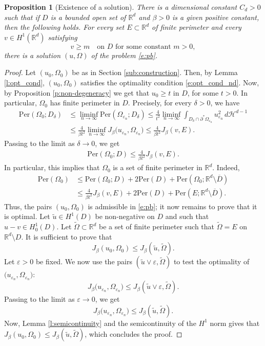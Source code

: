 \documentclass[11pt]{article}
\numberwithin{equation}{section}
\newcommand{\Per}{\mathrm{Per}}
\theoremstyle{plain}
\newtheorem{prop}[teo]{Proposition}
\theoremstyle{definition}
\let\eps\varepsilon
\def\R{\mathbb{R}}
\def\HH{\mathcal{H}}
\begin{document}
\begin{prop}[Existence of a solution]
There is a dimensional constant $C_d>0$ such that if $D$ is a bounded open set of $\R^d$ and $\beta>0$ is a given positive constant, then the following holds. For every set $E\subset\R^d$ of finite perimeter and every $v\in H^1(\R^d)$ satisfying
\[v\ge m\quad\text{on } D\text{ for some constant } m>0,\]
there is a solution $(u,\Omega)$ of the problem \eqref{e:pb}.
\end{prop}
\begin{proof}
Let $(u_0,\Omega_0)$ be as in Section \ref{sub:construction}. Then, by Lemma \ref{l:opt_cond}, $(u_0,\Omega_0)$ satisfies the optimality condition \eqref{e:opt_cond_nd}. Now, by Proposition \ref{p:non-degeneracy} we get that $u_0\ge t$ in $D$, for some $t>0$. In particular, $\Omega_0$ has finite perimeter in $D$. Precisely, for every $\delta>0$, we have
\begin{align*}
\Per(\Omega_0;D_\delta)&\le \liminf_{n\to\infty}\Per(\Omega_{\eps_n};D_\delta)\le \frac4{t^2}\liminf_{n\to\infty}\int_{D_\delta\cap\partial^\ast\Omega_{\eps_n}}u_{\eps_n}^2\,d\HH^{d-1}\\
&\le \frac4{\beta t^2}\liminf_{n\to\infty}J_\beta\big(u_{\eps_n},\Omega_{\eps_n}\big)\le \frac4{\beta t^2} J_\beta(v,E).
\end{align*}
Passing to the limit as $\delta\to0$, we get
\begin{align*}
\Per(\Omega_0;D)\le \frac4{\beta t^2} J_\beta(v,E).
\end{align*}
In particular, this implies that $\Omega_0$ is a set of finite perimeter in $\R^d$. Indeed,
\begin{align*}
\Per(\Omega_0)&\le \Per(\Omega_0;D)+2\Per(D)+\Per(\Omega_0;\R^d\setminus \overline D)\\
&\le \frac4{\beta t^2} J_\beta(v,E)+2\Per(D)+\Per(E;\R^d\setminus \overline D).
\end{align*}
Thus, the pairs $(u_0,\Omega_0)$ is admissible in \eqref{e:pb}; it now remains to prove that it is optimal. Let $\widetilde u\in H^1(D)$ be non-negative on $D$ and such that $u-v\in H^1_0(D)$. Let $\widetilde \Omega\subset\R^d$ be a set of finite perimeter such that $\widetilde \Omega=E$ on $\R^d\setminus D$. It is sufficient to prove that
\[J_\beta(u_0,\Omega_0)\le J_\beta(\widetilde u,\widetilde\Omega).\]
Let $\eps>0$ be fixed. We now use the pairs $(\widetilde u\vee \eps,\widetilde\Omega)$ to test the optimality of $\big(u_{\eps_n},\Omega_{\eps_n}\big)$:
\[J_\beta\big(u_{\eps_n},\Omega_{\eps_n}\big)\le J_\beta(\widetilde u\vee \eps,\widetilde\Omega).\]
Passing to the limit as $\eps\to0$, we get
\[J_\beta\big(u_{\eps_n},\Omega_{\eps_n}\big)\le J_\beta(\widetilde u,\widetilde\Omega).\]
Now, Lemma \ref{l:semicontinuity} and the semicontinuity of the $H^1$ norm gives that $J_\beta (u_0,\Omega_{0})\le J_\beta(\widetilde u,\widetilde\Omega)$,
which concludes the proof.
\end{proof}
\end{document}
